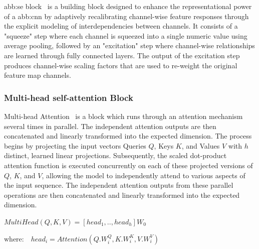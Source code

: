             \gls{abb:se} block~\cite{squeeze} is a building block designed to enhance the representational power of a \gls{abb:cnn} by adaptively recalibrating channel-wise feature responses through the explicit modeling of interdependencies between channels.
            It consists of a "squeeze" step where each channel is squeezed into a single numeric value using average pooling, followed by an "excitation" step where channel-wise relationships are learned through fully connected layers. The output of the excitation step produces channel-wise scaling factors that are used to re-weight the original feature map channels. 
        
        
        \subsubsection{Multi-head self-attention Block}
    
            Multi-head Attention~\cite{attention} is a block which runs through an attention mechanism several times in parallel. The independent attention outputs are then concatenated and linearly transformed into the expected dimension. 
            The process begins by projecting the input vectors Queries $Q$, Keys $K$, and Values $V$ with $h$ distinct, learned linear projections. Subsequently, the scaled dot-product attention function is executed concurrently on each of these projected versions of $Q$, $K$, and $V$, allowing the model to independently attend to various aspects of the input sequence. The independent attention outputs from these parallel operations are then concatenated and linearly transformed into the expected dimension. 
            

            $MultiHead(Q,K,V) = [head_1, ..,  head_h]W_0$
            
            $\text{where:}\quad  head_i = Attention(Q.W_i^Q, K.W_i^K, V.W_i^V)$
            
